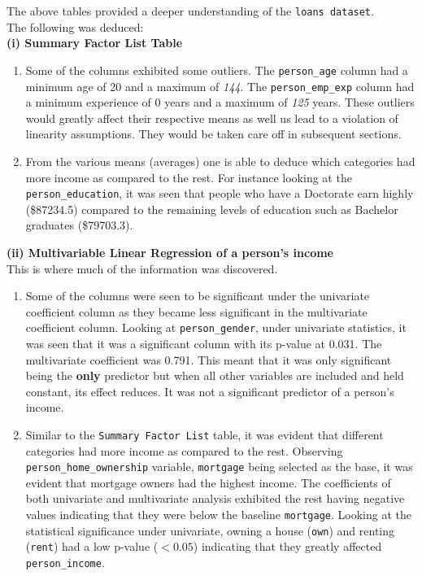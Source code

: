 \documentclass[
  10pt,
]{article}
\begin{document}
The above tables provided a deeper understanding of the
\texttt{loans\ dataset}.\\
The following was deduced:\\
\textbf{(i) Summary Factor List Table}\\

\begin{enumerate}
\def\labelenumi{\alph{enumi})}
\item
  Some of the columns exhibited some outliers. The \texttt{person\_age}
  column had a minimum age of 20 and a maximum of \emph{144}. The
  \texttt{person\_emp\_exp} column had a minimum experience of 0 years
  and a maximum of \emph{125} years. These outliers would greatly affect
  their respective means as well us lead to a violation of linearity
  assumptions. They would be taken care off in subsequent sections.\\
\item
  From the various means (averages) one is able to deduce which
  categories had more income as compared to the rest. For instance
  looking at the \texttt{person\_education}, it was seen that people who
  have a Doctorate earn highly (\$87234.5) compared to the remaining
  levels of education such as Bachelor graduates (\$79703.3).
\end{enumerate}

\textbf{(ii) Multivariable Linear Regression of a person's income}\\

This is where much of the information was discovered.\\

\begin{enumerate}
\def\labelenumi{\alph{enumi})}
\item
  Some of the columns were seen to be significant under the univariate
  coefficient column as they became less significant in the multivariate
  coefficient column. Looking at \texttt{person\_gender}, under
  univariate statistics, it was seen that it was a significant column
  with its p-value at 0.031. The multivariate coefficient was 0.791.
  This meant that it was only significant being the \textbf{only}
  predictor but when all other variables are included and held constant,
  its effect reduces. It was not a significant predictor of a person's
  income.\\
\item
  Similar to the \texttt{Summary\ Factor\ List} table, it was evident
  that different categories had more income as compared to the rest.
  Observing \texttt{person\_home\_ownership} variable, \texttt{mortgage}
  being selected as the base, it was evident that mortgage owners had
  the highest income. The coefficients of both univariate and
  multivariate analysis exhibited the rest having negative values
  indicating that they were below the baseline \texttt{mortgage}.
  Looking at the statistical significance under univariate, owning a
  house (\texttt{own}) and renting (\texttt{rent}) had a low p-value
  (\(< 0.05\)) indicating that they greatly affected
  \texttt{person\_income}.\\
\end{enumerate}
\end{document}
